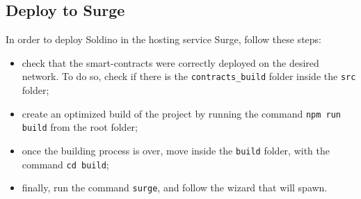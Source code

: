 \subsection{Deploy to Surge}
In order to deploy Soldino in the hosting service Surge, follow these steps:
\begin{itemize}
	\item check that the smart-contracts were correctly deployed on the desired network. To do so, check if there is the \texttt{contracts\_build} folder inside the \texttt{src} folder;
	\item create an optimized build of the project by running the command \texttt{npm run build} from the root folder;
	\item once the building process is over, move inside the \texttt{build} folder, with the command \texttt{cd build};
	\item finally, run the command \texttt{surge}, and follow the wizard that will spawn.
\end{itemize}
